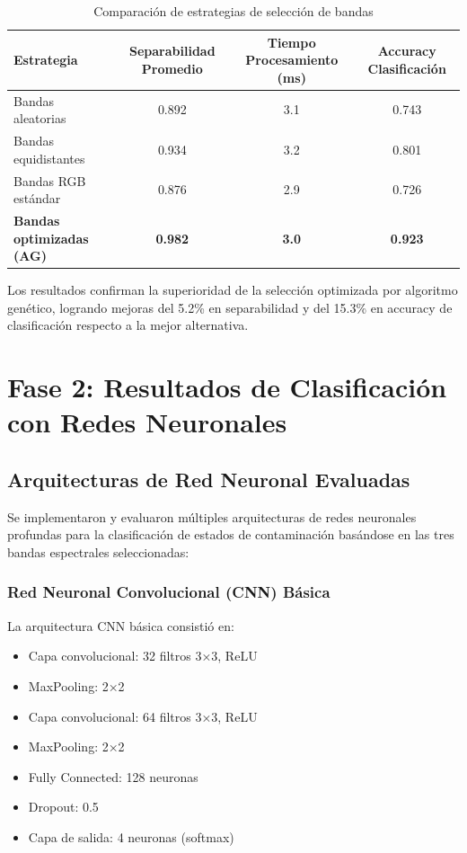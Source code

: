 \begin{table}[h!]
\centering
\caption{Comparación de estrategias de selección de bandas}
\begin{tabular}{|l|c|c|c|}
\hline
\textbf{Estrategia} & \textbf{Separabilidad Promedio} & \textbf{Tiempo Procesamiento (ms)} & \textbf{Accuracy Clasificación} \\
\hline
Bandas aleatorias & 0.892 & 3.1 & 0.743 \\
\hline
Bandas equidistantes & 0.934 & 3.2 & 0.801 \\
\hline
Bandas RGB estándar & 0.876 & 2.9 & 0.726 \\
\hline
\textbf{Bandas optimizadas (AG)} & \textbf{0.982} & \textbf{3.0} & \textbf{0.923} \\
\hline
\end{tabular}
\label{tab:band_selection_comparison}
\end{table}

Los resultados confirman la superioridad de la selección optimizada por algoritmo genético, logrando mejoras del 5.2\% en separabilidad y del 15.3\% en accuracy de clasificación respecto a la mejor alternativa.

\section{Fase 2: Resultados de Clasificación con Redes Neuronales}

\subsection{Arquitecturas de Red Neuronal Evaluadas}

Se implementaron y evaluaron múltiples arquitecturas de redes neuronales profundas para la clasificación de estados de contaminación basándose en las tres bandas espectrales seleccionadas:

\subsubsection{Red Neuronal Convolucional (CNN) Básica}

La arquitectura CNN básica consistió en:
\begin{itemize}
    \item Capa convolucional: 32 filtros 3×3, ReLU
    \item MaxPooling: 2×2
    \item Capa convolucional: 64 filtros 3×3, ReLU  
    \item MaxPooling: 2×2
    \item Fully Connected: 128 neuronas
    \item Dropout: 0.5
    \item Capa de salida: 4 neuronas (softmax)
\end{itemize}

